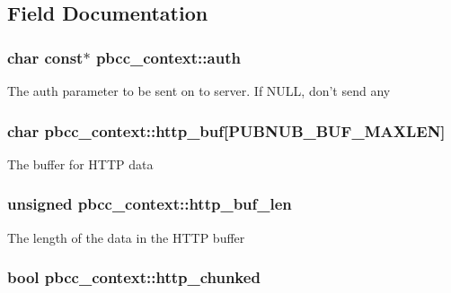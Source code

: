 \subsection{Field Documentation}
\hypertarget{structpbcc__context_a57d9d0b3237a59baee5b5bfe4ada1e88}{
\subsubsection[{auth}]{\setlength{\rightskip}{0pt plus 5cm}char const$\ast$ pbcc\-\_\-context\-::auth}}\label{structpbcc__context_a57d9d0b3237a59baee5b5bfe4ada1e88}
The {\ttfamily auth} parameter to be sent on to server. If N\-U\-L\-L, don't send any \hypertarget{structpbcc__context_a74521f09b39cc108dac6cee666119433}{
\subsubsection[{http\-\_\-buf}]{\setlength{\rightskip}{0pt plus 5cm}char pbcc\-\_\-context\-::http\-\_\-buf\mbox{[}P\-U\-B\-N\-U\-B\-\_\-\-B\-U\-F\-\_\-\-M\-A\-X\-L\-E\-N\mbox{]}}}\label{structpbcc__context_a74521f09b39cc108dac6cee666119433}
The buffer for H\-T\-T\-P data \hypertarget{structpbcc__context_a27c229bf8b80877f536520881466075a}{
\subsubsection[{http\-\_\-buf\-\_\-len}]{\setlength{\rightskip}{0pt plus 5cm}unsigned pbcc\-\_\-context\-::http\-\_\-buf\-\_\-len}}\label{structpbcc__context_a27c229bf8b80877f536520881466075a}
The length of the data in the H\-T\-T\-P buffer \hypertarget{structpbcc__context_a601d4aa87b762dc9b75c0f534179b9cf}{
\subsubsection[{http\-\_\-chunked}]{\setlength{\rightskip}{0pt plus 5cm}bool pbcc\-\_\-context\-::http\-\_\-chunked}}\label{structpbcc__context_a601d4aa87b762dc9b75c0f534179b9cf}
